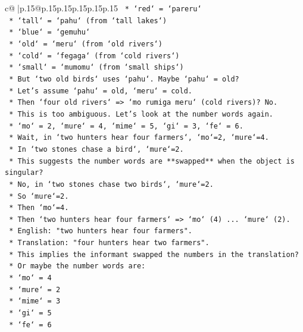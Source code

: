 \documentclass{article}
\begin{document}
{\begin{supertabular}{c@{$\;$}|p{.15\linewidth}@{}p{.15\linewidth}p{.15\linewidth}p{.15\linewidth}p{.15\linewidth}p{.15\linewidth}}
{{{\texttt{        *   `red` = `pareru`} \\
\texttt{        *   `tall` = `pahu` (from `tall lakes`)} \\
\texttt{        *   `blue` = `gemuhu`} \\
\texttt{        *   `old` = `meru` (from `old rivers`)} \\
\texttt{        *   `cold` = `fegaga` (from `cold rivers`)} \\
\texttt{        *   `small` = `mumomu` (from `small ships`)} \\
\texttt{    *   But `two old birds` uses `pahu`. Maybe `pahu` = old?} \\
\texttt{    *   Let's assume `pahu` = old, `meru` = cold.} \\
\texttt{    *   Then `four old rivers` => `mo rumiga meru` (cold rivers)? No.} \\
\texttt{    *   This is too ambiguous. Let's look at the number words again.} \\
\texttt{    *   `mo` = 2, `mure` = 4, `mime` = 5, `gi` = 3, `fe` = 6.} \\
\texttt{    *   Wait, in `two hunters hear four farmers`, `mo`=2, `mure`=4.} \\
\texttt{    *   In `two stones chase a bird`, `mure`=2.} \\
\texttt{    *   This suggests the number words are **swapped** when the object is singular?} \\
\texttt{    *   No, in `two stones chase two birds`, `mure`=2.} \\
\texttt{    *   So `mure`=2.} \\
\texttt{    *   Then `mo`=4.} \\
\texttt{    *   Then `two hunters hear four farmers` => `mo` (4) ... `mure` (2).} \\
\texttt{    *   English: "two hunters hear four farmers".} \\
\texttt{    *   Translation: "four hunters hear two farmers".} \\
\texttt{    *   This implies the informant swapped the numbers in the translation?} \\
\texttt{    *   Or maybe the number words are:} \\
\texttt{        *   `mo` = 4} \\
\texttt{        *   `mure` = 2} \\
\texttt{        *   `mime` = 3} \\
\texttt{        *   `gi` = 5} \\
\texttt{        *   `fe` = 6} \\
}}}
\end{supertabular}}
\end{document}
